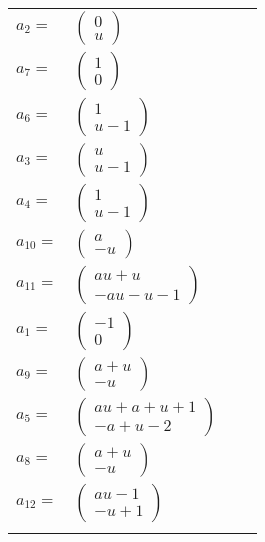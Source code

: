 \documentclass[1p]{elsarticle_modified}
\theoremstyle{definition}
\begin{document}
\begin{tabular}{m{7pt} m{180pt} m{7pt} m{180pt} }
\flushright $a_{2}=$&$\begin{pmatrix}0\\u\end{pmatrix}$ \\
\flushright $a_{7}=$&$\begin{pmatrix}1\\0\end{pmatrix}$ \\
\flushright $a_{6}=$&$\begin{pmatrix}1\\u-1\end{pmatrix}$ \\
\flushright $a_{3}=$&$\begin{pmatrix}u\\u-1\end{pmatrix}$ \\
\flushright $a_{4}=$&$\begin{pmatrix}1\\u-1\end{pmatrix}$ \\
\flushright $a_{10}=$&$\begin{pmatrix}a\\- u\end{pmatrix}$ \\
\flushright $a_{11}=$&$\begin{pmatrix}a u+u\\- a u- u-1\end{pmatrix}$ \\
\flushright $a_{1}=$&$\begin{pmatrix}-1\\0\end{pmatrix}$ \\
\flushright $a_{9}=$&$\begin{pmatrix}a+u\\- u\end{pmatrix}$ \\
\flushright $a_{5}=$&$\begin{pmatrix}a u+a+u+1\\- a+u-2\end{pmatrix}$ \\
\flushright $a_{8}=$&$\begin{pmatrix}a+u\\- u\end{pmatrix}$ \\
\flushright $a_{12}=$&$\begin{pmatrix}a u-1\\- u+1\end{pmatrix}$\\&\end{tabular}
\end{document}
